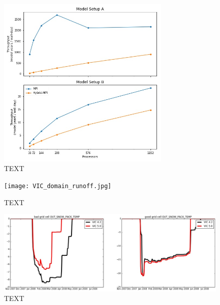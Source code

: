 \documentclass[gmd, manuscript]{copernicus}
\begin{document}
\begin{figure}[t]
\includegraphics[width=8.3cm]{VIC_scaling.jpg}
\caption{TEXT}
\label{fig:vic_scaling}
\end{figure}

\begin{figure}[t]
\texttt{[image: VIC\_domain\_runoff.jpg]}
\caption{TEXT}
\label{fig:vic_domain_results}
\end{figure}

\begin{figure}[t]
\includegraphics[width=12cm]{VIC_4v5.jpg}
\caption{TEXT}
\label{fig:vic_4v5}
\end{figure}
\end{document}
